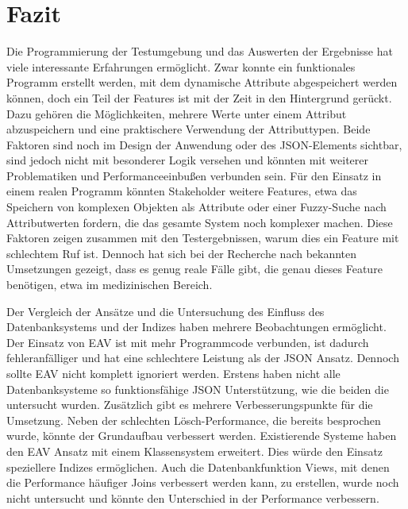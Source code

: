 


\section{Fazit}

Die Programmierung der Testumgebung und das Auswerten der Ergebnisse hat viele interessante Erfahrungen ermöglicht.
Zwar konnte ein funktionales Programm erstellt werden, mit dem dynamische Attribute abgespeichert werden können, doch ein Teil der Features ist mit der Zeit in den Hintergrund gerückt. Dazu gehören die Möglichkeiten, mehrere Werte unter einem Attribut abzuspeichern und eine praktischere Verwendung der Attributtypen. Beide Faktoren sind noch im Design der Anwendung oder des JSON-Elements sichtbar, sind jedoch nicht mit besonderer Logik versehen und könnten mit weiterer Problematiken und Performanceeinbußen verbunden sein. Für den Einsatz in einem realen Programm könnten Stakeholder weitere Features, etwa das Speichern von komplexen Objekten als Attribute oder einer Fuzzy-Suche nach Attributwerten fordern, die das gesamte System noch komplexer machen. Diese Faktoren zeigen zusammen mit den Testergebnissen, warum dies ein Feature mit schlechtem Ruf ist.
Dennoch hat sich bei der Recherche nach bekannten Umsetzungen gezeigt, dass es genug reale Fälle gibt, die genau dieses Feature benötigen, etwa im medizinischen Bereich.

Der Vergleich der Ansätze und die Untersuchung des Einfluss des Datenbanksystems und der Indizes haben mehrere Beobachtungen ermöglicht. 
Der Einsatz von EAV ist mit mehr Programmcode verbunden, ist dadurch fehleranfälliger und hat eine schlechtere Leistung als der JSON Ansatz. Dennoch sollte EAV nicht komplett ignoriert werden. Erstens haben nicht alle Datenbanksysteme so funktionsfähige JSON Unterstützung, wie die beiden die untersucht wurden. Zusätzlich gibt es mehrere Verbesserungspunkte für die Umsetzung. Neben der schlechten Lösch-Performance, die bereits besprochen wurde, könnte der Grundaufbau verbessert werden. Existierende Systeme haben den EAV Ansatz mit einem Klassensystem erweitert. Dies würde den Einsatz speziellere Indizes ermöglichen. Auch die Datenbankfunktion Views, mit denen die Performance häufiger Joins verbessert werden kann, zu erstellen, wurde noch nicht untersucht und könnte den Unterschied in der Performance verbessern.

